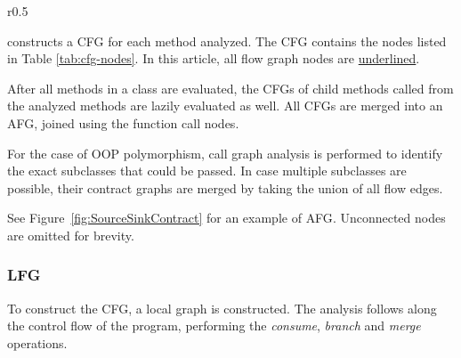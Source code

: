 \begin{wrapfigure}{r}{0.5\textwidth}
	\vspace{-3em}
	\begin{minipage}{0.5\textwidth}
		\caption{Example \ac{CFG} for Listing~\ref{lst:SourceSinkExample}}
		\begin{center}
		\end{center}
		\label{fig:SourceSinkContract}
	\end{minipage}
\end{wrapfigure}

\pname{} constructs a \ac{CFG} for each method analyzed.
The \ac{CFG} contains the nodes listed in Table \ref{tab:cfg-nodes}.
In this article, all flow graph nodes are \underline{underlined}.

After all methods in a class are evaluated,
the CFGs of child methods called from the analyzed methods
are lazily evaluated as well.
All CFGs are merged into an \ac{AFG},
joined using the function call nodes.

For the case of \ac{OOP} polymorphism,
call graph analysis is performed to identify
the exact subclasses that could be passed.
In case multiple subclasses are possible,
their contract graphs are merged by taking the union of all flow edges.

See Figure~\ref{fig:SourceSinkContract} for an example of \ac{AFG}.
Unconnected nodes are omitted for brevity.

\subsubsection{\acf{LFG}}
To construct the \ac{CFG},
a local graph is constructed.
The analysis follows along the control flow of the program,
performing the \emph{consume}, \emph{branch} and \emph{merge} operations.

